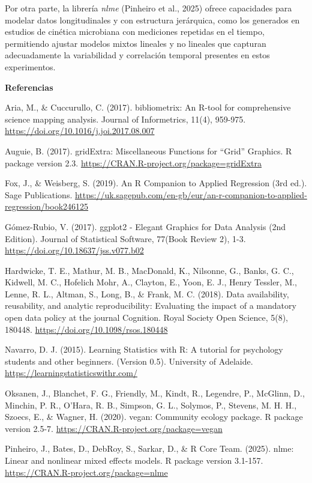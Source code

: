 \documentclass[
  letterpaper,
  DIV=11,
  numbers=noendperiod]{scrreprt}
\begin{document}
Por otra parte, la librería \emph{nlme} (Pinheiro et al., 2025) ofrece
capacidades para modelar datos longitudinales y con estructura
jerárquica, como los generados en estudios de cinética microbiana con
mediciones repetidas en el tiempo, permitiendo ajustar modelos mixtos
lineales y no lineales que capturan adecuadamente la variabilidad y
correlación temporal presentes en estos experimentos.

\textbf{Referencias}

Aria, M., \& Cuccurullo, C. (2017). bibliometrix: An R-tool for
comprehensive science mapping analysis. Journal of Informetrics, 11(4),
959-975. \url{https://doi.org/10.1016/j.joi.2017.08.007}

Auguie, B. (2017). gridExtra: Miscellaneous Functions for ``Grid''
Graphics. R package version 2.3.
\url{https://CRAN.R-project.org/package=gridExtra}

Fox, J., \& Weisberg, S. (2019). An R Companion to Applied Regression
(3rd ed.). Sage Publications.
\url{https://uk.sagepub.com/en-gb/eur/an-r-companion-to-applied-regression/book246125}

Gómez-Rubio, V. (2017). ggplot2 - Elegant Graphics for Data Analysis
(2nd Edition). Journal of Statistical Software, 77(Book Review 2), 1-3.
\url{https://doi.org/10.18637/jss.v077.b02}

Hardwicke, T. E., Mathur, M. B., MacDonald, K., Nilsonne, G., Banks, G.
C., Kidwell, M. C., Hofelich Mohr, A., Clayton, E., Yoon, E. J., Henry
Tessler, M., Lenne, R. L., Altman, S., Long, B., \& Frank, M. C. (2018).
Data availability, reusability, and analytic reproducibility: Evaluating
the impact of a mandatory open data policy at the journal Cognition.
Royal Society Open Science, 5(8), 180448.
\url{https://doi.org/10.1098/rsos.180448}

Navarro, D. J. (2015). Learning Statistics with R: A tutorial for
psychology students and other beginners. (Version 0.5). University of
Adelaide. \url{https://learningstatisticswithr.com/}

Oksanen, J., Blanchet, F. G., Friendly, M., Kindt, R., Legendre, P.,
McGlinn, D., Minchin, P. R., O'Hara, R. B., Simpson, G. L., Solymos, P.,
Stevens, M. H. H., Szoecs, E., \& Wagner, H. (2020). vegan: Community
ecology package. R package version 2.5-7.
\url{https://CRAN.R-project.org/package=vegan}

Pinheiro, J., Bates, D., DebRoy, S., Sarkar, D., \& R Core Team. (2025).
nlme: Linear and nonlinear mixed effects models. R package version
3.1-157. \url{https://CRAN.R-project.org/package=nlme}
\end{document}
